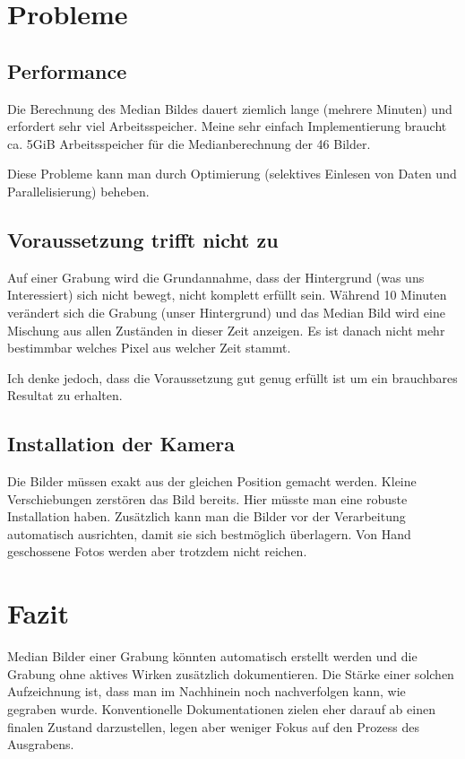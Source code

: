 \documentclass{paper}
\begin{document}
	\section{Probleme}
		\subsection{Performance}
			Die Berechnung des Median Bildes dauert ziemlich lange (mehrere Minuten) und erfordert sehr viel Arbeitsspeicher. Meine sehr einfach Implementierung braucht ca. 5GiB Arbeitsspeicher für die Medianberechnung der 46 Bilder.
			
			Diese Probleme kann man durch Optimierung (selektives Einlesen von Daten und Parallelisierung) beheben.
			
		\subsection{Voraussetzung trifft nicht zu}
			Auf einer Grabung wird die Grundannahme, dass der Hintergrund (was uns Interessiert) sich nicht bewegt, nicht komplett erfüllt sein. Während 10 Minuten verändert sich die Grabung (unser Hintergrund) und das Median Bild wird eine Mischung aus allen Zuständen in dieser Zeit anzeigen. Es ist danach nicht mehr bestimmbar welches Pixel aus welcher Zeit stammt.
			
			Ich denke jedoch, dass die Voraussetzung gut genug erfüllt ist um ein brauchbares Resultat zu erhalten.
		\subsection{Installation der Kamera}	
			Die Bilder müssen exakt aus der gleichen Position gemacht werden. Kleine Verschiebungen zerstören das Bild bereits.
			Hier müsste man eine robuste Installation haben. Zusätzlich kann man die Bilder vor der Verarbeitung automatisch ausrichten, damit sie sich bestmöglich überlagern. Von Hand geschossene Fotos werden aber trotzdem nicht reichen.

		\section{Fazit}
			Median Bilder einer Grabung könnten automatisch erstellt werden und die Grabung ohne aktives Wirken zusätzlich dokumentieren.
			Die Stärke einer solchen Aufzeichnung ist, dass man im Nachhinein noch nachverfolgen kann, wie gegraben wurde. Konventionelle Dokumentationen zielen eher darauf ab einen finalen Zustand darzustellen, legen aber weniger Fokus auf den Prozess des Ausgrabens.
		
\end{document}
